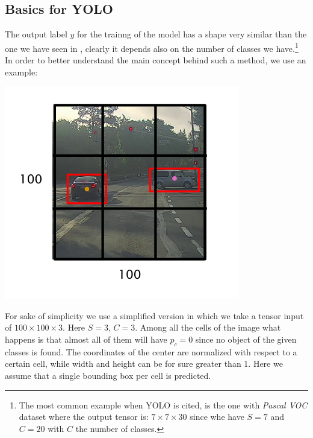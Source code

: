\subsection{Basics for YOLO}
The output label $y$ for the trainng of the model has a shape very similar than the one we have seen in , clearly it depends also on the number of classes we have.\footnote{
    The most common example when YOLO is cited, is the one with \emph{Pascal VOC} dataset where the output tensor is: $7\times7\times30$ since whe have $S=7$ and $C=20$ with $C$ the number of classes.
}
In order to better understand the main concept behind such a method, we use an example: 

\begin{multicols}{2}
    \begin{center}
        \includegraphics[scale=0.5]{img/YOLO_1.png}
    \end{center}
    \vspace{-0.5cm}
    For sake of simplicity we use a simplified version in which we take a tensor input of $100\times100\times3$. Here $S=3$, $C=3$. Among all the cells of the image what happens is that almost all of them will have $p_c=0$ since no object of the given classes is found. The coordinates of the center are normalized with respect to a certain cell, while width and height can  be for sure greater than 1. Here we assume that a single bounding box per cell is predicted.
\end{multicols}

